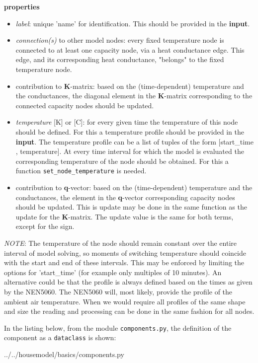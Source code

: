 \textbf{properties}
\begin{itemize}
	\item \emph{label}: unique 'name' for identification. This should be provided in the \textbf{input}.
	\item \emph{connection(s)} to other model nodes: every fixed temperature node is connected to at least one capacity node, via a heat conductance edge. This edge, and its corresponding heat conductance, "belongs" to the fixed temperature node.
	\item contribution to \textbf{K}-matrix: based on the (time-dependent) temperature and the conductances, the diagonal element in the \textbf{K}-matrix corresponding to the connected capacity nodes should be updated.
	\item \emph{temperature} [K] or [\degree C]: for every given time the temperature of this node should be defined. For this a temperature profile should be provided in the \textbf{input}. The temperature profile can be a list of tuples of the form [start\_time , temperature]. At every time interval for which the model is evaluated the corresponding temperature of the node should be obtained. For this a function \texttt{set\_node\_temperature} is needed. 
	\item contribution to \textbf{q}-vector: based on the (time-dependent) temperature and the conductances, the element in the \textbf{q}-vector corresponding capacity nodes should be updated. This is update may be done in the same function as the update for the \textbf{K}-matrix. The update value is the same for both terms, except for the sign. 
\end{itemize}
\emph{NOTE}: The temperature of the node should remain constant over the entire interval of model solving, so moments of switching temperature should coincide with the start and end of these intervals. This may be enforced by limiting the options for 'start\_time' (for example only multiples of 10 minutes). An alternative could be that the profile is always defined based on the times as given by the NEN5060. The NEN5060 will, most likely, provide the profile of the ambient air temperature. When we would require all profiles of the same shape and size the reading and processing can be done in the same fashion for all nodes. 

In the listing below, from the module \texttt{components.py}, the definition of the component as a \texttt{dataclass} is shown:
\begin{minipage}{\linewidth}
	 
	{../../housemodel/basics/components.py}
\end{minipage}

